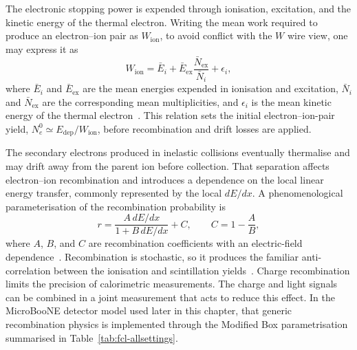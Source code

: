 The electronic stopping power is expended through ionisation, excitation, and
the kinetic energy of the thermal electron. Writing the mean work required to
produce an electron--ion pair as \(W_{\mathrm{ion}}\), to avoid conflict with
the \(W\) wire view, one may express it as
\begin{equation}
  W_{\mathrm{ion}}
  =
  \bar E_i
  +
  \bar E_{\mathrm{ex}}\frac{\bar N_{\mathrm{ex}}}{\bar N_i}
  +
  \epsilon_i,
  \label{eq:ch3-work-function}
\end{equation}
where \(\bar E_i\) and \(\bar E_{\mathrm{ex}}\) are the mean energies expended
in ionisation and excitation, \(\bar N_i\) and \(\bar N_{\mathrm{ex}}\) are
the corresponding mean multiplicities, and \(\epsilon_i\) is the mean kinetic
energy of the thermal electron~\cite{Doke2002,Hitachi1983}. This relation sets
the initial electron--ion-pair yield,
\(N_e^0 \simeq E_{\mathrm{dep}}/W_{\mathrm{ion}}\), before recombination and
drift losses are applied.

The secondary electrons produced in inelastic collisions eventually thermalise
and may drift away from the parent ion before collection. That separation
affects electron--ion recombination and introduces a dependence on the local
linear energy transfer, commonly represented by the local \(dE/dx\). A
phenomenological parameterisation of the recombination probability is
\begin{equation}
  r
  =
  \frac{A\,dE/dx}{1 + B\,dE/dx}
  +
  C,
  \qquad
  C = 1 - \frac{A}{B},
  \label{eq:ch3-recombination-probability}
\end{equation}
where \(A\), \(B\), and \(C\) are recombination coefficients with an
electric-field dependence~\cite{Birks1964,ThomasImel1987}. Recombination is
stochastic, so it produces the familiar anti-correlation between the
ionisation and scintillation yields~\cite{Hitachi1983,Doke2002}. Charge
recombination limits the precision of calorimetric measurements. The charge
and light signals can be combined in a joint measurement that acts to reduce
this effect. In the MicroBooNE detector model used later in this chapter, that
generic recombination physics is implemented through the Modified Box
parametrisation summarised in Table~\ref{tab:fcl-allsettings}.

